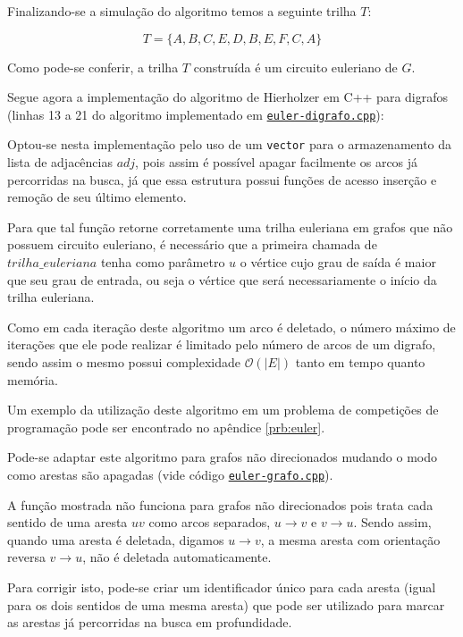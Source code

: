 Finalizando-se a simulação do algoritmo temos a seguinte trilha $T$:

\[
    T = \{A, B, C, E, D, B, E, F, C, A\}
\]

Como pode-se conferir, a trilha $T$ construída é um circuito euleriano de $G$.


Segue agora a implementação do algoritmo de Hierholzer em C++ para digrafos (linhas 13 a 21 do algoritmo implementado em \href{https://github.com/gafeol/chinese-postman/blob/master/code/euler-digrafo.cpp}{\texttt{euler-digrafo.cpp}}):



Optou-se nesta implementação pelo uso de um \texttt{vector} para o armazenamento da lista de adjacências $adj$, pois assim é possível apagar facilmente os arcos já percorridas na busca, já que essa estrutura possui funções de acesso inserção e remoção de seu último elemento.

Para que tal função retorne corretamente uma trilha euleriana em grafos que não possuem circuito euleriano, é necessário que a primeira chamada de $trilha\_euleriana$ tenha como parâmetro $u$ o vértice cujo grau de saída é maior que seu grau de entrada, ou seja o vértice que será necessariamente o início da trilha euleriana.

Como em cada iteração deste algoritmo um arco é deletado, o número máximo de iterações que ele pode realizar é limitado pelo número de arcos de um digrafo, sendo assim o mesmo possui complexidade $\mathcal{O}(|E|)$ tanto em tempo quanto memória.

Um exemplo da utilização deste algoritmo em um problema de competições de programação pode ser encontrado no apêndice \ref{prb:euler}.

Pode-se adaptar este algoritmo para grafos não direcionados mudando o modo como arestas são apagadas (vide código \href{https://github.com/gafeol/chinese-postman/blob/master/code/euler-grafo.cpp}{\texttt{euler-grafo.cpp}}).

A função mostrada não funciona para grafos não direcionados pois trata cada sentido de uma aresta $uv$ como arcos separados, $u \rightarrow v$ e $v \rightarrow u$. 
Sendo assim, quando uma aresta é deletada, digamos $u \rightarrow v$, a mesma aresta com orientação reversa $v \rightarrow u$, não é deletada automaticamente.

Para corrigir isto, pode-se criar um identificador único para cada aresta (igual para os dois sentidos de uma mesma aresta) que pode ser utilizado para marcar as arestas já percorridas na busca em profundidade.
